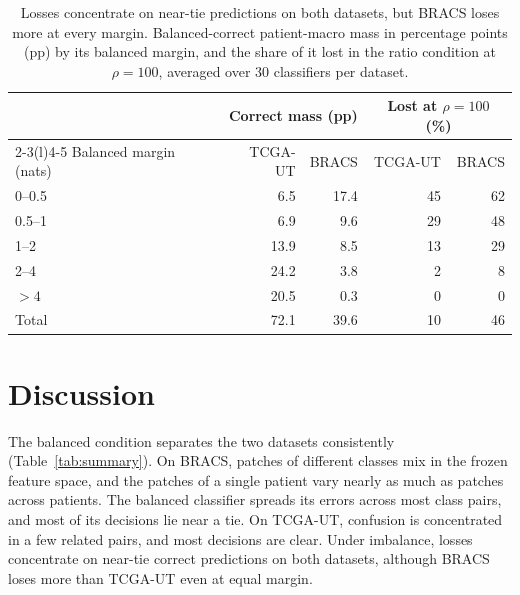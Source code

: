 \documentclass[11pt]{article}
\begin{document}
\begin{table}[!htb]
  \centering
  \small
  \begin{tabular}{@{}lrrrr@{}}
    \toprule
     & \multicolumn{2}{c}{Correct mass (pp)} & \multicolumn{2}{c}{Lost at $\rho=100$ (\%)} \\
    \cmidrule(lr){2-3}\cmidrule(l){4-5}
    Balanced margin (nats) & TCGA-UT & BRACS & TCGA-UT & BRACS \\
    \midrule
    0--0.5 & 6.5 & 17.4 & 45 & 62 \\
    0.5--1 & 6.9 & 9.6 & 29 & 48 \\
    1--2 & 13.9 & 8.5 & 13 & 29 \\
    2--4 & 24.2 & 3.8 & 2 & 8 \\
    $>4$ & 20.5 & 0.3 & 0 & 0 \\
    \midrule
    Total & 72.1 & 39.6 & 10 & 46 \\
    \bottomrule
  \end{tabular}
  \caption{Losses concentrate on near-tie predictions on both datasets, but BRACS loses more at every margin. Balanced-correct patient-macro mass in percentage points (pp) by its balanced margin, and the share of it lost in the ratio condition at $\rho=100$, averaged over 30 classifiers per dataset.}
  \label{tab:margin-bins}
\end{table}

\section{Discussion}
\label{sec:discussion}
The balanced condition separates the two datasets consistently (Table~\ref{tab:summary}). On BRACS, patches of different classes mix in the frozen feature space, and the patches of a single patient vary nearly as much as patches across patients. The balanced classifier spreads its errors across most class pairs, and most of its decisions lie near a tie. On TCGA-UT, confusion is concentrated in a few related pairs, and most decisions are clear. Under imbalance, losses concentrate on near-tie correct predictions on both datasets, although BRACS loses more than TCGA-UT even at equal margin.
\end{document}
